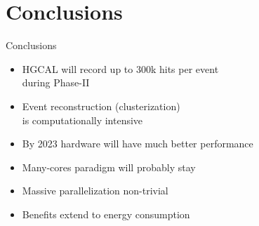 \documentclass{beamer}
\begin{document}
\section{Conclusions}

\begin{frame}{Conclusions}
\begin{center}
\begin{itemize}
\item HGCAL will record up to 300k hits per event\\ during Phase-II
\vspace{3mm}
\item Event reconstruction (clusterization)\\ is computationally intensive
\vspace{3mm}
\item By 2023 hardware will have much better performance
\vspace{3mm}
\item Many-cores paradigm will probably stay
\vspace{3mm}
\item Massive parallelization non-trivial
\vspace{3mm}
\item Benefits extend to energy consumption
\end{itemize}
\end{center}
\end{frame}
\end{document}
